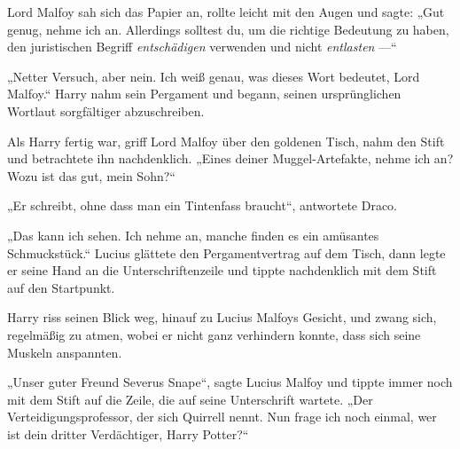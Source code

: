 Lord Malfoy sah sich das Papier an, rollte leicht mit den Augen und sagte:
„Gut genug, nehme ich an. Allerdings solltest du, um die richtige Bedeutung zu haben, den juristischen Begriff \emph{entschädigen} verwenden und nicht \emph{entlasten} —“

„Netter Versuch, aber nein. Ich weiß genau, was dieses Wort bedeutet, Lord Malfoy.“ Harry nahm sein Pergament und begann, seinen ursprünglichen Wortlaut sorgfältiger abzuschreiben.

Als Harry fertig war, griff Lord Malfoy über den goldenen Tisch, nahm den Stift und betrachtete ihn nachdenklich.
„Eines deiner Muggel-Artefakte, nehme ich an? Wozu ist das gut, mein Sohn?“

„Er schreibt, ohne dass man ein Tintenfass braucht“, antwortete Draco.

„Das kann ich sehen. Ich nehme an, manche finden es ein amüsantes Schmuckstück.“ Lucius glättete den Pergamentvertrag auf dem Tisch, dann legte er seine Hand an die Unterschriftenzeile und tippte nachdenklich mit dem Stift auf den Startpunkt.

Harry riss seinen Blick weg, hinauf zu Lucius Malfoys Gesicht, und zwang sich, regelmäßig zu atmen, wobei er nicht ganz verhindern konnte, dass sich seine Muskeln anspannten.

„Unser guter Freund Severus Snape“, sagte Lucius Malfoy und tippte immer noch mit dem Stift auf die Zeile, die auf seine Unterschrift wartete.
„Der Verteidigungsprofessor, der sich Quirrell nennt. Nun frage ich noch einmal, wer ist dein dritter Verdächtiger, Harry Potter?“


